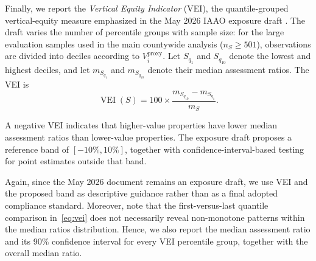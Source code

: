 \documentclass[10pt]{article}
\theoremstyle{definition}
\newcommand{\1}{\mathbf{1}}
\begin{document}


Finally, we report the \emph{Vertical Equity Indicator} (VEI), the quantile-grouped vertical-equity measure emphasized in the May 2026 IAAO exposure draft \cite{IAAO2026ExposureRatio}.
The draft varies the number of percentile groups with sample size: for the large evaluation samples used in the main countywide analysis ($n_S\geq 501$), observations are divided into deciles according to $V_i^{\mathrm{proxy}}$. Let $S_{q_1}$ and $S_{q_{10}}$ denote the lowest and highest deciles, and let $m_{S_{q_1}}$ and $m_{S_{q_{10}}}$ denote their median assessment ratios. The VEI is
\begin{equation}
\label{eq:vei}
\operatorname{VEI}(S)
=
100\times
\frac{m_{S_{q_{10}}}-m_{S_{q_1}}}{m_S}.
\end{equation}

A negative VEI indicates that higher-value properties have lower median assessment ratios than lower-value properties. The exposure draft proposes a reference band of $[-10\%,10\%]$, together with confidence-interval-based testing for point estimates outside that band.

{Again, since the May 2026 document remains an exposure draft, we use VEI and the proposed band as descriptive guidance rather than as a final adopted compliance standard. Moreover, note that the first-versus-last quantile comparison in~\eqref{eq:vei} does not necessarily reveal non-monotone patterns within the median ratios distribution. Hence, we also report the median assessment ratio and its 90\% confidence interval for every VEI percentile group, together with the overall median ratio.} 


\end{document}
